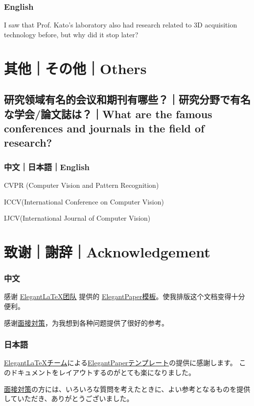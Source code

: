 \documentclass[lang=cn,11pt,a4paper]{elegantpaper}
\begin{document}
\subsubsection{English}
I saw that Prof. Kato's laboratory also had research related to 3D acquisition technology before, but why did it stop later?
\section{其他｜その他｜Others}
\subsection{研究领域有名的会议和期刊有哪些？｜研究分野で有名な学会/論文誌は？｜What are the famous conferences and journals in the field of research?}
\subsubsection{中文｜日本語｜English}
CVPR (Computer Vision and Pattern Recognition)

ICCV(International Conference on Computer Vision)

IJCV(International Journal of Computer Vision)

\section{致谢｜謝辞｜Acknowledgement}
\subsubsection{中文}
感谢  \href{https://elegantlatex.org/}{ElegantLaTeX团队} 提供的 \href{https://github.com/ElegantLaTeX/ElegantPaper}{ElegantPaper模板}。使我排版这个文档变得十分便利。

感谢\href{https://hatodove22.notion.site/16f0eba93f3c4153bd1f770892aaf6b1}{面接対策}，为我想到各种问题提供了很好的参考。
\subsubsection{日本語}
\href{https://elegantlatex.org/}{ElegantLaTeXチーム}による\href{https://github.com/ElegantLaTeX/ElegantPaper}{ElegantPaperテンプレート}の提供に感謝します。 このドキュメントをレイアウトするのがとても楽になりました。

\href{https://hatodove22.notion.site/16f0eba93f3c4153bd1f770892aaf6b1}{面接対策}の方には、いろいろな質問を考えたときに、よい参考となるものを提供していただき、ありがとうございました。
\end{document}
